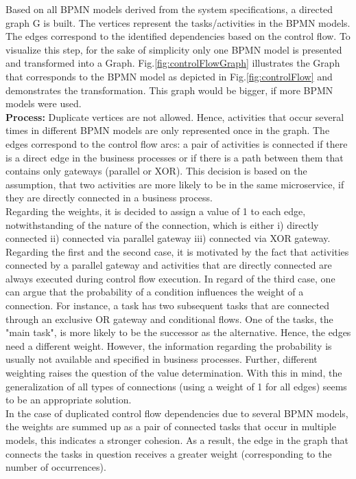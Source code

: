 \noindent
Based on all BPMN models derived from the system specifications, a directed graph G is built.  The vertices represent the tasks/activities in the BPMN models. The edges correspond to the identified dependencies based on the control flow. To visualize this step, for the sake of simplicity only one BPMN model is presented and transformed into a Graph. Fig.\ref{fig:controlFlowGraph} illustrates the Graph that corresponds to the BPMN model as depicted in Fig.\ref{fig:controlFlow} and demonstrates the transformation. This graph would be bigger, if more BPMN models were used.  \\

\noindent
\textbf{Process:} Duplicate vertices are not allowed. Hence, activities that occur several times in different BPMN models are only represented once in the graph.
The edges correspond to the control flow arcs: a pair of activities is connected if there is a direct edge in the business processes or if there is a path between them that contains only gateways (parallel or XOR). This decision is based on the assumption, that two activities are more likely to be in the same microservice, if they are directly connected in a business process. \\
Regarding the weights, it is decided to assign a value of 1 to each edge, notwithstanding of the nature of the connection, which is either i) directly connected ii) connected via parallel gateway iii) connected via XOR gateway. Regarding the first and the second case, it is motivated by the fact that activities connected by a parallel gateway and activities that are directly connected are always executed during control flow execution.
In regard of the third case, one can argue that the probability of a condition influences the weight of a connection. For instance, a task has two subsequent tasks that are connected through an exclusive OR gateway and conditional flows. One of the tasks, the "main task", is more likely to be the successor as the alternative. Hence, the edges need a different weight. However, the information regarding the probability is usually not available and specified in business processes. Further, different weighting raises the question of the value determination. With this in mind, the generalization of all types of connections (using a weight of 1 for all edges) seems to be an appropriate solution. \\
In the case of duplicated control flow dependencies due to several BPMN models, the weights are summed up as a pair of connected tasks that occur in multiple models, this indicates a stronger cohesion. As a result, the edge in the graph that connects the tasks in question receives a greater weight (corresponding to the number of occurrences).\\

